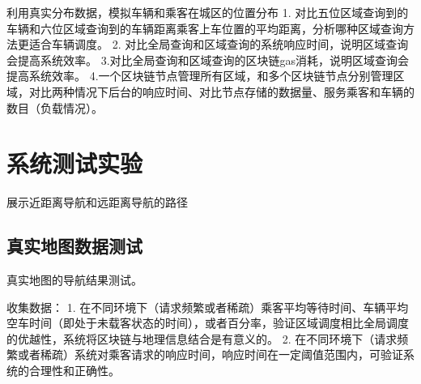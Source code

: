 利用真实分布数据，模拟车辆和乘客在城区的位置分布
1. 对比五位区域查询到的车辆和六位区域查询到的车辆距离乘客上车位置的平均距离，分析哪种区域查询方法更适合车辆调度。
2. 对比全局查询和区域查询的系统响应时间，说明区域查询会提高系统效率。
3.对比全局查询和区域查询的区块链gas消耗，说明区域查询会提高系统效率。
4.一个区块链节点管理所有区域，和多个区块链节点分别管理区域，对比两种情况下后台的响应时间、对比节点存储的数据量、服务乘客和车辆的数目（负载情况）。

\section{系统测试实验}

展示近距离导航和远距离导航的路径

\subsection{真实地图数据测试}
真实地图的导航结果测试。

收集数据：
1. 在不同环境下（请求频繁或者稀疏）乘客平均等待时间、车辆平均空车时间（即处于未载客状态的时间），或者百分率，验证区域调度相比全局调度的优越性，系统将区块链与地理信息结合是有意义的。
2. 在不同环境下（请求频繁或者稀疏）系统对乘客请求的响应时间，响应时间在一定阈值范围内，可验证系统的合理性和正确性。